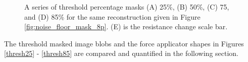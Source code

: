 \begin{figure}[H]
\begin{minipage}[t]{.1\textwidth}
        \hfill
    \end{minipage}  
\caption{A series of threshold percentage masks (A) 25\%, (B) 50\%, (C) 75, and (D) 85\% for the same reconstruction given in Figure \ref{fig:noise_floor_mask_8p}. (E) is the resistance change scale bar.}
\label{fig:thresh_masks}
\end{figure}
The threshold masked image blobs and the force applicator shapes in Figures \ref{thresh25} - \ref{thresh85} are compared and quantified in the following section.

